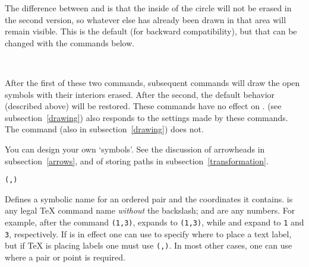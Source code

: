 \documentclass[letterpaper]{article}
\begin{document}
The difference between  and
 is that the inside of the circle will not
be erased in the second version, so whatever else has already been drawn
in that area will remain visible. This is the default (for backward
compatibility), but that can be changed with the commands below.

\begin{cd}
\\
%
%
\end{cd}

After the first of these two commands, subsequent 
commands will draw the open symbols with their interiors erased. After
the second, the default behavior (described above) will be restored.
These commands have no effect on .  (see
subsection~\ref{drawing}) also responds to the settings made by these
commands. The  command (also in subsection~\ref{drawing}) does
not.

You can design your own `symbols'. See the discussion of arrowheads in
subsection~\ref{arrows}, and of storing paths in
subsection~\ref{transformation}.

\begin{cd}
\texttt{(,)}%
\end{cd}

Defines a symbolic name for an ordered pair and the coordinates it
contains.  is any legal \TeX{} command name \emph{without}
the backslash;  and  are any numbers. For
example, after the command \texttt{(1,3)}, 
expands to \texttt{(1,3)}, while  and  expand to
\texttt{1} and \texttt{3}, respectively. If  is in effect
one can use  to specify where to place a text label, but if \TeX{}
is placing labels one must use \texttt{(,)}. In most
other cases, one can use  where a pair or point is required.

\begin{cd}
\\
%
%
\end{cd}
\end{document}
